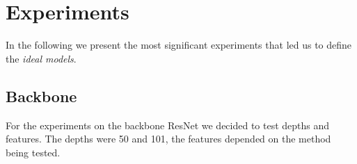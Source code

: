 \documentclass[10pt,twocolumn,letterpaper]{article}
\begin{document}
\section{Experiments}
\label{sec:experiments}
In the following we present the most significant experiments that led us to define the \textit{ideal models}.


\subsection{Backbone}
\label{experiments:second_trial}
For the experiments on the backbone ResNet we decided to test depths and features.
The depths were 50 and 101, the features depended on the method being tested.
\end{document}
